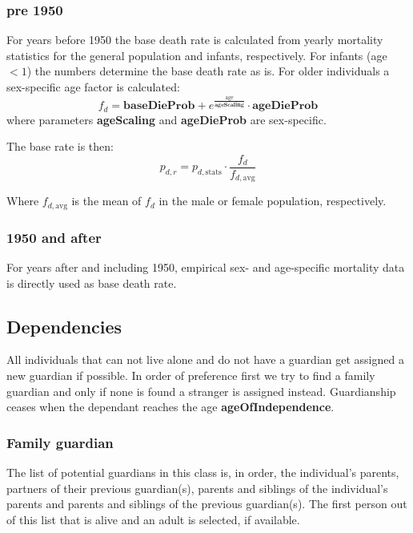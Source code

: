 \documentclass{article}
\newcommand{\marginnote}[1]{\protect\marginpar{\small\texttt{#1}}}
\begin{document}
\subsubsection*{pre 1950}

For years before 1950 the base death rate is calculated from yearly mortality statistics for the general population and infants, respectively. For infants (age $< 1$) the numbers determine the base death rate as is. For older individuals a sex-specific age factor is calculated:
\[
f_d =\mathbf{baseDieProb} + e^\frac{\textrm{age}}{\mathbf{ageScaling}} \cdot \mathbf{ageDieProb}
\]
where parameters \textbf{ageScaling} and \textbf{ageDieProb} are sex-specific.

The base rate is then:
\[
p_{d,r} = p_{d,\mathrm{stats}} \cdot \frac{f_d}{f_{d,\mathrm{avg}}} 
\]

Where $f_{d,\mathrm{avg}}$ is the mean of $f_d$ in the male or female population, respectively.

\subsubsection*{1950 and after}

For years after and including 1950, empirical sex- and age-specific mortality data is directly used as base death rate.


\subsection{Dependencies \marginnote{Dependencies.jl}} 

All individuals that can not live alone and do not have a guardian get assigned a new guardian if possible. In order of preference first we try to find a family guardian and only if none is found a stranger is assigned instead. Guardianship ceases when the dependant reaches the age \textbf{ageOfIndependence}.

\subsubsection*{Family guardian}

The list of potential guardians in this class is, in order, the individual's parents, partners of their previous guardian(s), parents and siblings of the individual's parents and parents and siblings of the previous guardian(s). The first person out of this list that is alive and an adult is selected, if available.
\end{document}
